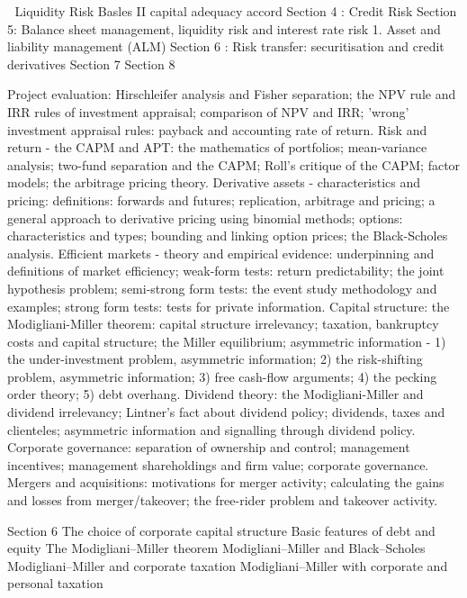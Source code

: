 

Liquidity Risk
Basles II capital adequacy accord
Section 4 : Credit Risk
Section 5: Balance sheet management, liquidity risk and interest rate risk
1. Asset and liability management (ALM)
Section 6 : Risk transfer: securitisation and credit derivatives
Section 7
Section 8


Project evaluation: Hirschleifer analysis and Fisher separation; the NPV rule and IRR rules of investment appraisal; comparison of NPV and IRR; 'wrong' investment appraisal rules: payback and accounting rate of return.
Risk and return - the CAPM and APT: the mathematics of portfolios; mean-variance analysis; two-fund separation and the CAPM; Roll's critique of the CAPM; factor models; the arbitrage pricing theory.
Derivative assets - characteristics and pricing: definitions: forwards and futures; replication, arbitrage and pricing; a general approach to derivative pricing using binomial methods; options: characteristics and types; bounding and linking option prices; the Black-Scholes analysis.
Efficient markets - theory and empirical evidence: underpinning and definitions of market efficiency; weak-form tests: return predictability; the joint hypothesis problem; semi-strong form tests: the event study methodology and examples; strong form tests: tests for private information.
Capital structure: the Modigliani-Miller theorem: capital structure irrelevancy; taxation, bankruptcy costs and capital structure; the Miller equilibrium; asymmetric information - 1) the under-investment problem, asymmetric information; 2) the risk-shifting problem, asymmetric information; 3) free cash-flow arguments; 4) the pecking order theory; 5) debt overhang.
Dividend theory: the Modigliani-Miller and dividend irrelevancy; Lintner's fact about dividend policy; dividends, taxes and clienteles; asymmetric information and signalling through dividend policy.
Corporate governance: separation of ownership and control; management incentives; management shareholdings and firm value; corporate governance.
Mergers and acquisitions: motivations for merger activity; calculating the gains and losses from merger/takeover; the free-rider problem and takeover activity.

Section 6 The choice of corporate capital structure
Basic features of debt and equity 
The Modigliani–Miller theorem 
Modigliani–Miller and Black–Scholes
Modigliani–Miller and corporate taxation
Modigliani–Miller with corporate and personal taxation





















